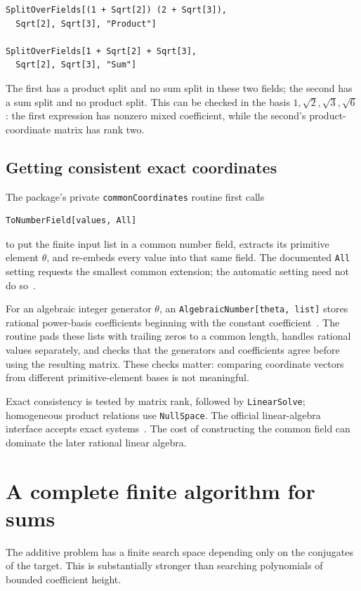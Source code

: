 \documentclass[11pt,letterpaper]{article}
\theoremstyle{definition}\newtheorem{definition}[theorem]{Definition}
\theoremstyle{remark}\newtheorem{remark}[theorem]{Remark}
\newcommand{\WL}[1]{\texttt{#1}}
\begin{document}
\begin{lstlisting}
SplitOverFields[(1 + Sqrt[2]) (2 + Sqrt[3]),
  Sqrt[2], Sqrt[3], "Product"]

SplitOverFields[1 + Sqrt[2] + Sqrt[3],
  Sqrt[2], Sqrt[3], "Sum"]
\end{lstlisting}
The first has a product split and no sum split in these two fields; the second has a sum split and no product split. This can be checked in the basis $1,\sqrt2,\sqrt3,\sqrt6$: the first expression has nonzero mixed coefficient, while the second's product-coordinate matrix has rank two.

\subsection{Getting consistent exact coordinates}
The package's private \WL{commonCoordinates} routine first calls
\begin{lstlisting}
ToNumberField[values, All]
\end{lstlisting}
to put the finite input list in a common number field, extracts its primitive element $\theta$, and re-embeds every value into that same field. The documented \WL{All} setting requests the smallest common extension; the automatic setting need not do so~\cite{tonumberfield}.

For an algebraic integer generator $\theta$, an \WL{AlgebraicNumber[theta, list]} stores rational power-basis coefficients beginning with the constant coefficient~\cite{algebraicnumber}. The routine pads these lists with trailing zeros to a common length, handles rational values separately, and checks that the generators and coefficients agree before using the resulting matrix. These checks matter: comparing coordinate vectors from different primitive-element bases is not meaningful.

Exact consistency is tested by matrix rank, followed by \WL{LinearSolve}; homogeneous product relations use \WL{NullSpace}. The official linear-algebra interface accepts exact systems~\cite{linearsolve}. The cost of constructing the common field can dominate the later rational linear algebra.

\section{A complete finite algorithm for sums}
\label{sec:additive}
The additive problem has a finite search space depending only on the conjugates of the target. This is substantially stronger than searching polynomials of bounded coefficient height.
\end{document}
